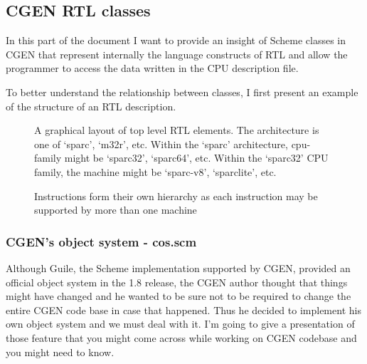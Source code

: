 \documentclass{article}
\begin{document}
\subsection{CGEN RTL classes} \label{sec:rtl-classes}
In this part of the document I want to provide an insight of Scheme classes in CGEN that represent internally the language constructs of RTL and allow the programmer to access the data written in the CPU description file.

To better understand the relationship between classes, I first present an example of the structure of an RTL description.

\begin{figure}[H]
	\centering
	\caption{A graphical layout of top level RTL elements. The architecture is one of `sparc', `m32r', etc. Within the `sparc' architecture, cpu-family might be `sparc32', `sparc64', etc. Within the `sparc32' CPU family, the machine might be `sparc-v8', `sparclite', etc.}
\end{figure}

\begin{figure}[H]
	\centering
	\caption{Instructions form their own hierarchy as each instruction may be supported by more than one machine}
\end{figure}

\subsubsection{CGEN's object system - cos.scm}
Although Guile, the Scheme implementation supported by CGEN, provided an official object system in the 1.8 release, the CGEN author thought that things might have changed and he wanted to be sure not to be required to change the entire CGEN code base in case that happened. Thus he decided to implement his own object system and we must deal with it. I'm going to give a presentation of those feature that you might come across while working on CGEN codebase and you might need to know.
\end{document}
